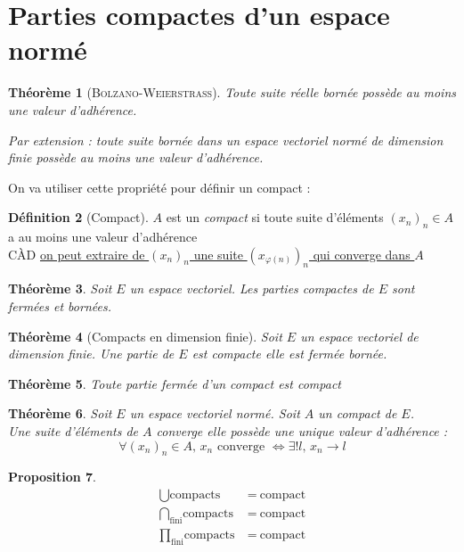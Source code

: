\documentclass[11pt,a4paper]{report}
\newtheorem{theorem}{Théorème}[chapter]
\newtheorem{itheorem}[theorem]{Théorème}
\newtheorem{prop}[theorem]{Proposition}
\theoremstyle{definition}
\newtheorem{dfn}[theorem]{Définition}
\begin{document}
\section{Parties compactes d'un espace normé} %
\label{sec:compacts}
\begin{itheorem}[\textsc{Bolzano-Weierstrass}]
     Toute suite réelle \emph{bornée} possède au moins une valeur d'adhérence.\par
     Par extension : toute suite bornée dans un espace vectoriel normé de dimension finie possède au moins une valeur d'adhérence.
     
\end{itheorem}
On va utiliser cette propriété pour définir un compact :
\begin{dfn}[Compact]
$A$ est un \emph{compact} si toute suite d'éléments $(x_n)_n \in A$ a au moins une valeur d'adhérence\\
CÀD \uline{on peut extraire de $(x_n)_n$ une suite $\left( x_{\varphi(n)} \right)
_n$ qui converge dans $A$}
\end{dfn}
\begin{itheorem}
     Soit $E$ un espace vectoriel. Les parties compactes de $E$ sont fermées et bornées.
\end{itheorem}
\begin{theorem}[Compacts en dimension finie]
     Soit $E$ un espace vectoriel de dimension finie. \newline
     Une partie de $E$ est compacte \Longleftrightarrow elle est fermée bornée.
\end{theorem}
\begin{theorem}
     Toute partie fermée d'un compact est compact
\end{theorem}
\begin{theorem}
     Soit $E$ un espace vectoriel normé. Soit $A$ un compact de $E$.\\
     Une suite d'éléments de $A$ converge \Longleftrightarrow elle possède une unique valeur d'adhérence : 
     \begin{equation}
     \forall (x_n)_n \in A,\, x_n \text{ converge } \Leftrightarrow \exists ! l,\, x_n\to l
     \end{equation}
\end{theorem}
\begin{prop}
    \begin{align*}
          \bigcup \text{compacts}~ &= ~\text{compact} \\
          \bigcap_{\text{fini}}\text{compacts}~ &= ~\text{compact}\\
          \prod_{\text{fini}}\text{compacts}~ &= ~\text{compact}
    \end{align*}
\end{prop}
\end{document}
